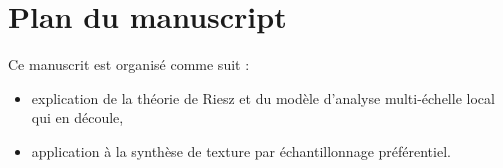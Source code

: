 \section{Plan du manuscript} %

Ce manuscrit est organisé comme suit :

\begin{itemize}
    \item explication de la théorie de Riesz et du modèle d'analyse multi-échelle local qui en découle,
    \item application à la synthèse de texture par échantillonnage préférentiel.
\end{itemize}